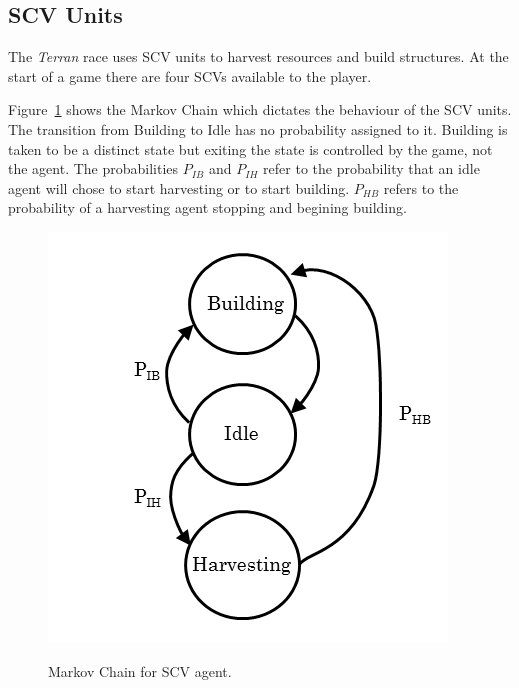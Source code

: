 \subsection{SCV Units}

The \textit{Terran} race uses SCV units to harvest resources and build structures. At the start of a game there are four SCVs available to the player.

Figure~\ref{fig:scv_diagram} shows the Markov Chain which dictates the behaviour of the SCV units. The transition from Building to Idle has no probability assigned to it. Building is taken to be a distinct state but exiting the state is controlled by the game, not the agent. The probabilities \(P_{IB}\) and \(P_{IH}\) refer to the probability that an idle agent will chose to start harvesting or to start building. \(P_{HB}\) refers to the probability of a harvesting agent stopping and begining building.

\begin{figure}
\centering
\includegraphics[scale=0.8, trim = 0cm 0cm 0cm 0cm]{diagrams/scv}
\label{fig:scv_diagram}
\caption{Markov Chain for SCV agent.}
\end{figure}